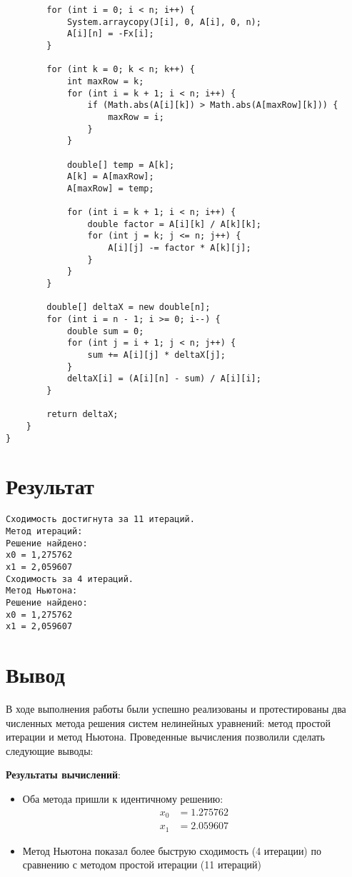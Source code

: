 \begin{verbatim}
        for (int i = 0; i < n; i++) {
            System.arraycopy(J[i], 0, A[i], 0, n);
            A[i][n] = -Fx[i];
        }

        for (int k = 0; k < n; k++) {
            int maxRow = k;
            for (int i = k + 1; i < n; i++) {
                if (Math.abs(A[i][k]) > Math.abs(A[maxRow][k])) {
                    maxRow = i;
                }
            }

            double[] temp = A[k];
            A[k] = A[maxRow];
            A[maxRow] = temp;

            for (int i = k + 1; i < n; i++) {
                double factor = A[i][k] / A[k][k];
                for (int j = k; j <= n; j++) {
                    A[i][j] -= factor * A[k][j];
                }
            }
        }

        double[] deltaX = new double[n];
        for (int i = n - 1; i >= 0; i--) {
            double sum = 0;
            for (int j = i + 1; j < n; j++) {
                sum += A[i][j] * deltaX[j];
            }
            deltaX[i] = (A[i][n] - sum) / A[i][i];
        }

        return deltaX;
    }
}
\end{verbatim}

\section*{Результат}

\begin{verbatim}
Сходимость достигнута за 11 итераций.
Метод итераций:
Решение найдено:
x0 = 1,275762
x1 = 2,059607
Сходимость за 4 итераций.
Метод Ньютона:
Решение найдено:
x0 = 1,275762
x1 = 2,059607
\end{verbatim}

\section*{Вывод}

В ходе выполнения работы были успешно реализованы и протестированы два численных метода решения систем нелинейных уравнений: 
метод простой итерации и метод Ньютона. Проведенные вычисления позволили сделать следующие выводы:

\textbf{Результаты вычислений}:
\begin{itemize}
\item Оба метода пришли к идентичному решению:
\begin{align*}
x_0 &= 1.275762 \\
x_1 &= 2.059607
\end{align*}
\item Метод Ньютона показал более быструю сходимость (4 итерации) по сравнению с методом простой итерации (11 итераций)
\end{itemize}

